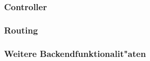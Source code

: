 \subsubsection{Controller} 



\subsubsection{Routing} 


\subsubsection{Weitere Backendfunktionalit"aten} 


